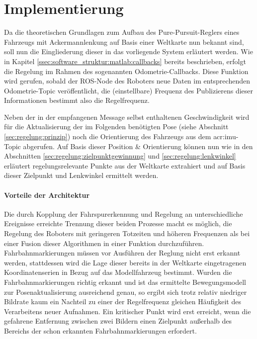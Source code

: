 \section{Implementierung \dcsecondauthorshort}
\label{sec:regelung:implementierung}
Da die theoretischen Grundlagen zum Aufbau des \glqq Pure-Pursuit\grqq-Reglers eines Fahrzeugs mit Ackermannlenkung auf Basis einer Weltkarte nun bekannt sind, soll nun die Eingliederung dieser in das vorliegende System erläutert werden. Wie in Kapitel \ref{ssec:software_struktur:matlab:callbacks} bereits beschrieben, erfolgt die Regelung im Rahmen des sogenannten Odometrie-Callbacks. Diese Funktion wird gerufen, sobald der ROS-Node des Roboters neue Daten im entsprechenden Odometrie-Topic veröffentlicht, die (einstellbare) Frequenz des Publizierens dieser Informationen bestimmt also die Regelfrequenz.

Neben der in der empfangenen Message selbst enthaltenen Geschwindigkeit wird für die Aktualisierung der im Folgenden benötigten Pose (siehe Abschnitt \ref{sec:regelung:prinzip}) noch die Orientierung des Fahrzeugs aus dem \gls{acr:imu}-Topic abgerufen. Auf Basis dieser Position \& Orientierung können nun wie in den Abschnitten \ref{sec:regelung:zielpunktgewinnung} und \ref{sec:regelung:lenkwinkel} erläutert regelungsrelevante Punkte aus der Weltkarte extrahiert und auf Basis dieser Zielpunkt und Lenkwinkel ermittelt werden.

\paragraph{Vorteile der Architektur}
Die durch Kopplung der Fahrspurerkennung und Regelung an unterschiedliche Ereignisse erreichte Trennung dieser beiden Prozesse macht es möglich, die Regelung des Roboters mit geringeren Totzeiten und höheren Frequenzen als bei einer Fusion dieser Algorithmen in einer Funktion durchzuführen. Fahrbahnmarkierungen müssen vor Ausführen der Reglung nicht erst erkannt werden, stattdessen wird die Lage dieser bereits in der Weltkarte eingetragenen Koordinatenserien in Bezug auf das Modellfahrzeug bestimmt. Wurden die Fahrbahnmarkierungen richtig erkannt und ist das ermittelte Bewegungsmodell zur Posenaktualisierung ausreichend genau, so ergibt sich trotz relativ niedriger Bildrate kaum ein Nachteil zu einer der Regelfrequenz gleichen Häufigkeit des Verarbeitens neuer Aufnahmen. Ein kritischer Punkt wird erst erreicht, wenn die gefahrene Entfernung zwischen zwei Bildern einen Zielpunkt außerhalb des Bereichs der schon erkannten Fahrbahnmarkierungen erfordert.